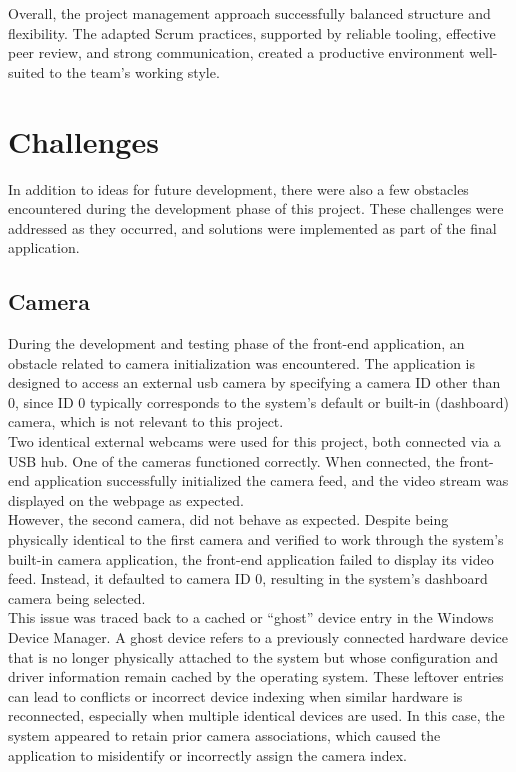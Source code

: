 Overall, the project management approach successfully balanced structure and flexibility. The adapted Scrum practices, supported by reliable tooling, effective peer review, and strong communication, created a productive environment well-suited to the team's working style. 

\section{Challenges}
In addition to ideas for future development, there were also a few obstacles encountered during the development phase of this project. These challenges were addressed as they occurred, and solutions were implemented as part of the final application. \\

\subsection{Camera}
During the development and testing phase of the front-end application, an obstacle related to camera initialization was encountered. The application is designed to access an external \gls{usb} camera by specifying a camera ID other than 0, since ID 0 typically corresponds to the system's default or built-in (dashboard) camera, which is not relevant to this project.\\

Two identical external webcams were used for this project, both connected via a USB hub. One of the cameras functioned correctly. When connected, the front-end application successfully initialized the camera feed, and the video stream was displayed on the webpage as expected.\\

However, the second camera, did not behave as expected. Despite being physically identical to the first camera and verified to work through the system's built-in camera application, the front-end application failed to display its video feed. Instead, it defaulted to camera ID 0, resulting in the system's dashboard camera being selected.\\

This issue was traced back to a cached or “ghost” device entry in the Windows Device Manager. A ghost device refers to a previously connected hardware device that is no longer physically attached to the system but whose configuration and driver information remain cached by the operating system. These leftover entries can lead to conflicts or incorrect device indexing when similar hardware is reconnected, especially when multiple identical devices are used. In this case, the system appeared to retain prior camera associations, which caused the application to misidentify or incorrectly assign the camera index.

